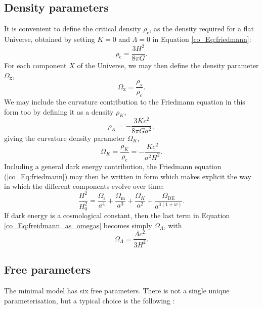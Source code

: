 \subsection{Density parameters}

It is convenient to define the critical density $\rho_\text{c}$, as the density required for a flat Universe, obtained by setting $K = 0$ and $\Lambda = 0$ in Equation \eqref{co_Eq:friedmann}:
\begin{equation}
\rho_\text{c} = \frac{3 H^2}{8 \pi G}.
\end{equation}
For each component $X$ of the Universe, we may then define the density parameter $\Omega_\text{x}$,
\begin{equation}
\Omega_\text{x} = \frac{\rho_\text{x}}{\rho_\text{c}}.
\end{equation}
We may include the curvature contribution to the Friedmann equation in this form too by defining it as a density $\rho_K$,
\begin{equation}
\rho_K = -\frac{3 K c^2}{8 \pi G a^2},
\end{equation}
giving the curvature density parameter $\Omega_K$,
\begin{equation}
\Omega_K = \frac{\rho_K}{\rho_\text{c}}
= -\frac{K c^2}{a^2 H^2}.
\end{equation}
Including a general dark energy contribution, the Friedmann equation (\autoref{co_Eq:friedmann}) may then be written in form which makes explicit the way in which the different components evolve over time:
\begin{equation}
\frac{H^2}{H_0^2} =
\frac{\Omega_\text{r}}{a^4} +
\frac{\Omega_\text{m}}{a^3} +
\frac{\Omega_K}{a^2} +
\frac{\Omega_\text{DE}}{a^{3 \left( 1 + w \right)}}.
\label{co_Eq:freidmann_as_omegas}
\end{equation}
If dark energy is a cosmological constant, then the last term in Equation \eqref{co_Eq:freidmann_as_omegas} becomes simply $\Omega_\Lambda$, with
\begin{equation}
\Omega_\Lambda = \frac{\Lambda c^2}{3 H^2}.
\end{equation}

\subsection{Free parameters}
\label{co_Sec:free_params}

The minimal \lcdm{} model has six free parameters. There is not a single unique parameterisation, but a typical choice is the following \citep[e.g.][]{DiValentino2015}:

